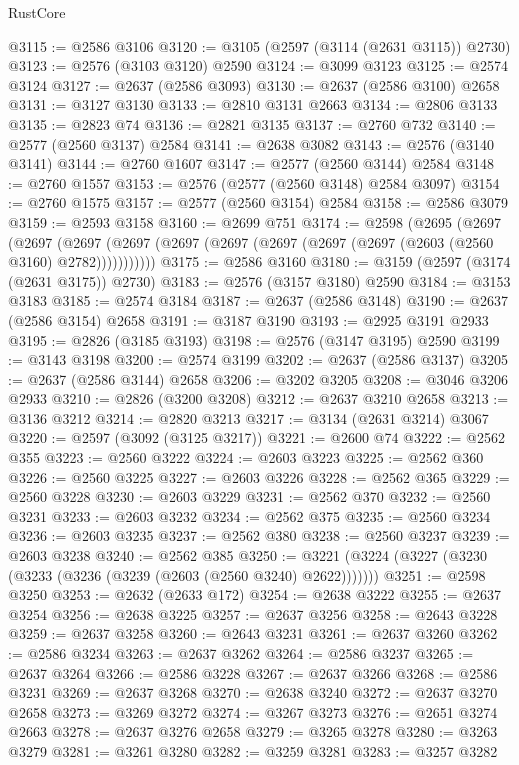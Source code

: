 \begin{lexlean}{RustCore}
\begin{coremodule}
@3115 := @2586 @3106
@3120 := @3105 (@2597 (@3114 (@2631 @3115)) @2730)
@3123 := @2576 (@3103 @3120) @2590
@3124 := @3099 @3123
@3125 := @2574 @3124
@3127 := @2637 (@2586 @3093)
@3130 := @2637 (@2586 @3100) @2658
@3131 := @3127 @3130
@3133 := @2810 @3131 @2663
@3134 := @2806 @3133
@3135 := @2823 @74
@3136 := @2821 @3135
@3137 := @2760 @732
@3140 := @2577 (@2560 @3137) @2584
@3141 := @2638 @3082
@3143 := @2576 (@3140 @3141)
@3144 := @2760 @1607
@3147 := @2577 (@2560 @3144) @2584
@3148 := @2760 @1557
@3153 := @2576 (@2577 (@2560 @3148) @2584 @3097)
@3154 := @2760 @1575
@3157 := @2577 (@2560 @3154) @2584
@3158 := @2586 @3079
@3159 := @2593 @3158
@3160 := @2699 @751
@3174 := @2598
    (@2695
      (@2697
        (@2697
          (@2697 (@2697 (@2697 (@2697 (@2697 (@2697 (@2697 (@2603 (@2560 @3160) @2782)))))))))))
@3175 := @2586 @3160
@3180 := @3159 (@2597 (@3174 (@2631 @3175)) @2730)
@3183 := @2576 (@3157 @3180) @2590
@3184 := @3153 @3183
@3185 := @2574 @3184
@3187 := @2637 (@2586 @3148)
@3190 := @2637 (@2586 @3154) @2658
@3191 := @3187 @3190
@3193 := @2925 @3191 @2933
@3195 := @2826 (@3185 @3193)
@3198 := @2576 (@3147 @3195) @2590
@3199 := @3143 @3198
@3200 := @2574 @3199
@3202 := @2637 (@2586 @3137)
@3205 := @2637 (@2586 @3144) @2658
@3206 := @3202 @3205
@3208 := @3046 @3206 @2933
@3210 := @2826 (@3200 @3208)
@3212 := @2637 @3210 @2658
@3213 := @3136 @3212
@3214 := @2820 @3213
@3217 := @3134 (@2631 @3214) @3067
@3220 := @2597 (@3092 (@3125 @3217))
@3221 := @2600 @74
@3222 := @2562 @355
@3223 := @2560 @3222
@3224 := @2603 @3223
@3225 := @2562 @360
@3226 := @2560 @3225
@3227 := @2603 @3226
@3228 := @2562 @365
@3229 := @2560 @3228
@3230 := @2603 @3229
@3231 := @2562 @370
@3232 := @2560 @3231
@3233 := @2603 @3232
@3234 := @2562 @375
@3235 := @2560 @3234
@3236 := @2603 @3235
@3237 := @2562 @380
@3238 := @2560 @3237
@3239 := @2603 @3238
@3240 := @2562 @385
@3250 := @3221 (@3224 (@3227 (@3230 (@3233 (@3236 (@3239 (@2603 (@2560 @3240) @2622)))))))
@3251 := @2598 @3250
@3253 := @2632 (@2633 @172)
@3254 := @2638 @3222
@3255 := @2637 @3254
@3256 := @2638 @3225
@3257 := @2637 @3256
@3258 := @2643 @3228
@3259 := @2637 @3258
@3260 := @2643 @3231
@3261 := @2637 @3260
@3262 := @2586 @3234
@3263 := @2637 @3262
@3264 := @2586 @3237
@3265 := @2637 @3264
@3266 := @2586 @3228
@3267 := @2637 @3266
@3268 := @2586 @3231
@3269 := @2637 @3268
@3270 := @2638 @3240
@3272 := @2637 @3270 @2658
@3273 := @3269 @3272
@3274 := @3267 @3273
@3276 := @2651 @3274 @2663
@3278 := @2637 @3276 @2658
@3279 := @3265 @3278
@3280 := @3263 @3279
@3281 := @3261 @3280
@3282 := @3259 @3281
@3283 := @3257 @3282

\end{coremodule}
\end{lexlean}
